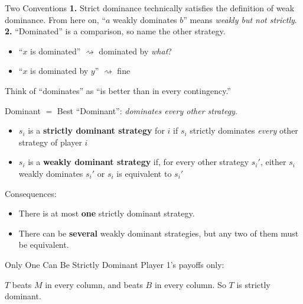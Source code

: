\begin{frame}{Two Conventions}
\textbf{1.} Strict dominance technically satisfies the definition of weak dominance.
\bsk
From here on, ``$a$ weakly dominates $b$'' means
\textit{weakly but not strictly}.
\vfill
\textbf{2.} ``Dominated'' is a comparison, so name the other strategy.
\bsk
\begin{itemize}
    \item ``$x$ is dominated'' \hspace{0.35in} $\rightsquigarrow$ \hspace{0.1in} dominated by \textit{what}?
    \item ``$x$ is dominated by $y$'' \hspace{0.05in} $\rightsquigarrow$ \hspace{0.1in} fine
\end{itemize}
\bsk
Think of ``dominates'' as ``is better than in every contingency.''
\vspace{-0.4in}
\end{frame}

\begin{frame}{Dominant $=$ Best}
``Dominant'': \textit{dominates every other strategy}.
\bsk
\begin{itemize}
    \item $s_i$ is a \textbf{strictly dominant strategy} for $i$ if $s_i$ strictly dominates
      \textit{every} other strategy of player $i$
    \bsk
    \item $s_i$ is a \textbf{weakly dominant strategy} if, for every other strategy $s_i'$,
      either $s_i$ weakly dominates $s_i'$ or $s_i$ is equivalent to $s_i'$
\end{itemize}
\vfill
Consequences:
\begin{itemize}
    \item There is at most \textbf{one} strictly dominant strategy.
    \vspace{0.35in}
    \item There can be \textbf{several} weakly dominant strategies, but any two of
      them must be equivalent.
\end{itemize}
\vspace{0.2in}
\end{frame}

\begin{frame}{Only One Can Be Strictly Dominant}
Player 1's payoffs only:
\bsk
\centering
\begin{matrixgame}[top={L, C, R}, left={T, M, B}, player names={Player 1, Player 2}]
\end{matrixgame}
\bsk
\raggedright
$T$ beats $M$ in every column, and beats $B$ in every column. So $T$ is strictly dominant.
\end{frame}

